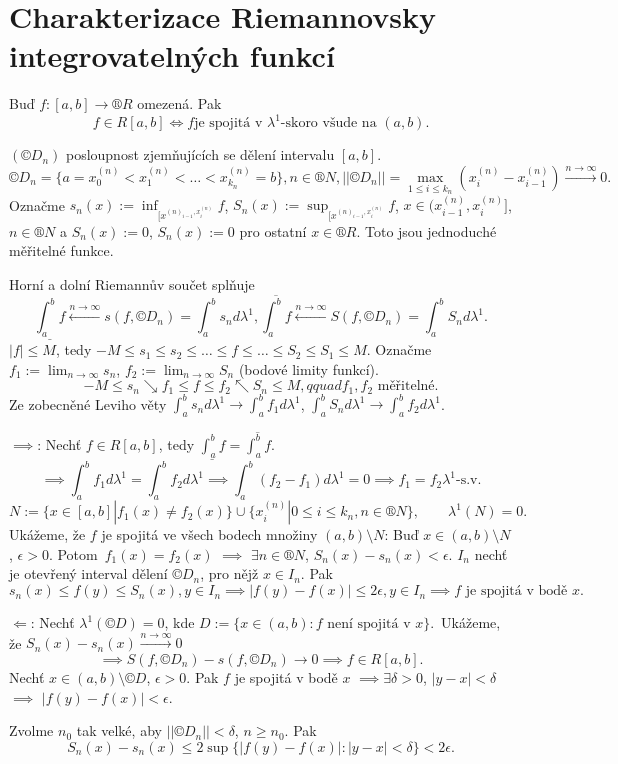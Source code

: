 \documentclass[12pt]{article}					%
\begin{document}
\section{Charakterizace Riemannovsky integrovatelných funkcí}
\begin{veta}
	Buď $f: [a, b] \rightarrow ®R$ omezená. Pak
	$$ f \in R[a, b] \Leftrightarrow f \text{je spojitá v $\lambda^1$-skoro všude na $(a, b)$}. $$

	\begin{dukazin}
		$(©D_n)$ posloupnost zjemňujících se dělení intervalu $[a, b]$.
		$$ ©D_n = \{a = x_0^{(n)} < x_1^{(n)} < … < x_{k_n}^{(n)} = b\}, n \in ®N, ||©D_n|| = \max_{1 ≤ i ≤ k_n} (x_i^{(n)} - x_{i-1}^{(n)}) \stackrel{n \rightarrow ∞}{\rightarrow} 0. $$
		Označme $s_n(x) := \inf_{[x^{(n)_{i-1}, x_i^{(n)}}} f$, $S_n(x) := \sup_{[x^{(n)_{i-1}, x_i^{(n)}}} f$, $x \in (x_{i-1}^{(n)}, x_i^{(n)}]$, $n \in ®N$ a $S_n(x) := 0$, $S_n(x):= 0$ pro ostatní $x \in ®R$. Toto jsou jednoduché měřitelné funkce.

		Horní a dolní Riemannův součet splňuje
		$$ \underline{\int_a^b f} \stackrel{n \rightarrow ∞}{\leftarrow} s(f, ©D_n) = \int_a^b s_n d\lambda^1, \overline{\int_a^b f} \stackrel{n \rightarrow ∞}{\leftarrow} S(f, ©D_n) = \int_a^b S_n d\lambda^1. $$
		$|f| ≤ M$, tedy $-M ≤ s_1 ≤ s_2 ≤ … ≤ f ≤ … ≤ S_2 ≤ S_1 ≤ M$. Označme $f_1 := \lim_{n \rightarrow ∞} s_n$, $f_2 := \lim_{n \rightarrow ∞} S_n$ (bodové limity funkcí).
		$$ -M ≤ s_n \searrow f_1 ≤ f ≤ f_2 \nwarrow S_n ≤ M, qquad f_1, f_2 \text{ měřitelné}. $$
		Ze zobecněné Leviho věty $\int_a^b s_n d\lambda^1 \rightarrow \int_a^b f_1 d\lambda^1$, $\int_a^b S_n d\lambda^1 \rightarrow \int_a^b f_2 d \lambda^1$.

		$\implies$: Nechť $f \in R[a, b]$, tedy $\underline{\int_a^b f} = \overline{\int_a^b f}$.
		$$ \implies \int_a^b f_1 d\lambda^1 = \int_a^b f_2 d \lambda^1 \implies \int_a^b (f_2 - f_1) d\lambda^1 = 0 \implies f_1 = f_2 \lambda^1\text{-s.v.} $$
		$$ N := \{x \in [a, b] | f_1(x) ≠ f_2(x)\} \cup \{x_i^{(n)} | 0 ≤ i ≤ k_n, n \in ®N\}, \qquad \lambda^1(N) = 0. $$
		Ukážeme, že $f$ je spojitá ve všech bodech množiny $(a, b) \setminus N$: Buď $x \in (a, b) \setminus N$, $\epsilon > 0$. Potom $f_1(x) = f_2(x)$ $\implies$ $\exists n \in ®N$, $S_n(x) - s_n(x) < \epsilon$. $I_n$ nechť je otevřený interval dělení $©D_n$, pro nějž $x \in I_n$. Pak
		$$ s_n(x) ≤ f(y) ≤ S_n(x), y \in I_n \implies |f(y) - f(x)| ≤ 2\epsilon, y \in I_n \implies f \text{ je spojitá v bodě $x$.} $$

		$\Leftarrow$: Nechť $\lambda^1(©D) = 0$, kde $D := \{x \in (a, b): f\text{ není spojitá v }x\}$. Ukážeme, že $S_n(x) - s_n(x) \stackrel{n \rightarrow ∞}{\rightarrow} 0$
		$$ \implies S(f, ©D_n) - s(f, ©D_n) \rightarrow 0 \implies f \in R[a, b]. $$
		Nechť $x \in (a, b) \setminus ©D$, $\epsilon > 0$. Pak $f$ je spojitá v bodě $x$ $\implies \exists \delta > 0$, $|y - x| < \delta$ $\implies$ $|f(y) - f(x)| < \epsilon$.

		Zvolme $n_0$ tak velké, aby $||©D_n|| < \delta$, $n ≥ n_0$. Pak 
		$$ S_n(x) - s_n(x) ≤ 2 \sup\{|f(y) - f(x)|: |y - x| < \delta\} < 2\epsilon. $$
	\end{dukazin}
\end{veta}
\end{document}

